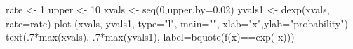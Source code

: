 \begin{Schunk}
\begin{Sinput}
 rate <- 1
 upper <- 10 
 xvals <- seq(0,upper,by=0.02)
 yvals1 <- dexp(xvals, rate=rate)
 plot (xvals, yvals1, type="l", main="", xlab="x",ylab="probability")
 text(.7*max(xvals), .7*max(yvals1), label=bquote(f(x)==exp(-x)))
\end{Sinput}
\end{Schunk}

